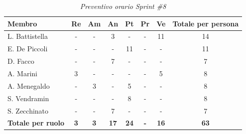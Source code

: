 ﻿\documentclass[a4paper, 10pt, colorlinks=true, linkcolor=black, urlcolor=blue, citecolor=blue, hidelinks]{article}
\renewcommand{\arraystretch}{1.2}
\begin{document}
\begin{table}[H]
    \centering
    \renewcommand{\arraystretch}{1.4}
    \begin{tabular}{|l|c|c|c|c|c|c|c|}
        \hline
        \rowcolor{bluBitless!15}
        \textbf{Membro} & \textbf{Re} & \textbf{Am} & \textbf{An} & \textbf{Pt} & \textbf{Pr} & \textbf{Ve} & \textbf{Totale per persona} \\
        \hline
        L. Battistella & - & - & 3 & - & - & 11 & 14 \\ \hline
        E. De Piccoli & - & - & - & 11 & - & - & 11 \\ \hline
        D. Facco & - & - & 7 & - & - & - & 7 \\ \hline
        A. Marini & 3 & - & - & - & - & 5 & 8 \\ \hline
        A. Menegaldo & - & 3 & - & 5 & - & - & 8 \\ \hline
        S. Vendramin & - & - & - & 8 & - & - & 8 \\ \hline
        S. Zecchinato & - & - & 7 & - & - & - & 7 \\ \hline
        \rowcolor{bluBitless!8}
        \textbf{Totale per ruolo} & \textbf{3} & \textbf{3} & \textbf{17} & \textbf{24} & \textbf{-} & \textbf{16} & \textbf{63} \\
        \hline
    \end{tabular}
    \caption{\textit{Preventivo orario Sprint \#8}}
\end{table}
\end{document}

